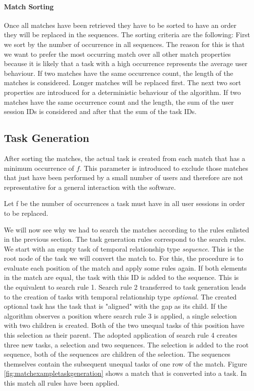 \paragraph{Match Sorting}
Once all matches have been retrieved they have to be sorted to have an order they will be replaced in the sequences. The sorting criteria are the following:
First we sort by the number of occurrence in all sequences.
The reason for this is that we want to prefer the most occurring match over all other match properties because it is likely that a task with a high occurrence represents
the average user behaviour. If two matches have the same occurrence count, the length of the matches is considered. Longer matches will be replaced first.
The next two sort properties are introduced for a deterministic behaviour of the algorithm.
If two matches have the same occurrence count and the length, the sum of the user session IDs is considered and after that the sum of the task IDs.


\subsection{Task Generation}
After sorting the matches, the actual task is created from each match that has a minimum occurrence of $f$.
This parameter is introduced to exclude those matches that just have been performed by a small number of users and therefore are not representative for a general interaction with the software.
\begin{definition}
	\item Let f be the number of occurrences a task must have in all user sessions in order to be replaced.
		\label{def:minoccurrencecount}
\end{definition}
We will now see why we had to search the matches according to the rules enlisted in the previous section. The task generation rules correspond to the search rules.
We start with an empty task of temporal relationship type \textit{sequence}.
This is the root node of the task we will convert the match to.
For this, the procedure is to evaluate each position of the match and apply some rules again.
If both elements in the match are equal, the task with this ID is added to the sequence. This is the equivalent to search rule 1.
Search rule 2 transferred to task generation leads to the creation of tasks with temporal relationship type \textit{optional}.
The created optional task has the task that is "aligned" with the gap as its child.
If the algorithm observes a position where search rule 3 is applied, a single selection with two children is created.
Both of the two unequal tasks of this position have this selection as their parent.
The adopted application of search rule 4 creates three new tasks, a selection and two sequences.
The selection is added to the root sequence, both of the sequences are children of the selection.
The sequences themselves contain the subsequent unequal tasks of one row of the match.
Figure \ref{fig:matchexampletaskgeneration} shows a match that is converted into a task. In this match all rules have been applied.

